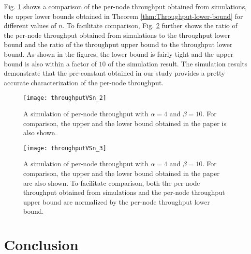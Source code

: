 \documentclass[english]{IEEEtran}
\theoremstyle{plain}
\theoremstyle{plain}
\theoremstyle{plain}
\theoremstyle{remark}
\begin{document}
Fig. \ref{fig:throughput} shows a comparison of the per-node throughput
obtained from simulations, the upper lower bounds obtained in Theorem
\ref{thm:Throughput-lower-bound} for different values of $n$. To
facilitate comparison, Fig. \ref{fig:Tightness of two bounds} further
shows the ratio of the per-node throughput obtained from simulations
to the throughput lower bound and the ratio of the throughput upper
bound to the throughput lower bound. As shown in the figures, the
lower bound is fairly tight and the upper bound is also within a factor
of $10$ of the simulation result. The simulation results demonstrate
that the pre-constant obtained in our study provides a pretty accurate
characterization of the per-node throughput.

\begin{figure}
\begin{centering}
\texttt{[image: throughputVSn\_2]}
\par\end{centering}

\protect\caption{\label{fig:throughput}A simulation of per-node throughput with $\alpha=4$
and $\beta=10$. For comparison, the upper and the lower bound obtained
in the paper is also shown.}
\end{figure}


\begin{figure}
\begin{centering}
\texttt{[image: throughputVSn\_3]}
\par\end{centering}

\protect\caption{\label{fig:Tightness of two bounds}A simulation of per-node throughput
with $\alpha=4$ and $\beta=10$. For comparison, the upper and the
lower bound obtained in the paper are also shown. To facilitate comparison,
both the per-node throughput obtained from simulations and the per-node
throughput upper bound are normalized by the per-node throughput lower
bound.}
\end{figure}



\section{Conclusion\label{sec:Conclusion}}
\end{document}
